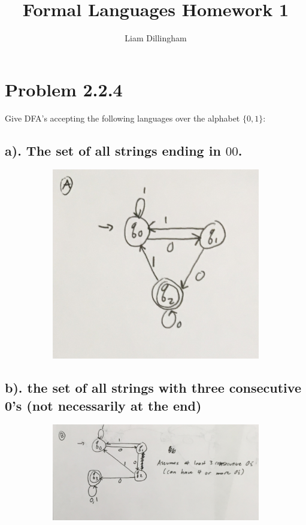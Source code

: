 \documentclass[20pt]{article} %
\title{Formal Languages Homework 1}
\author{Liam Dillingham}
\begin{document}
\maketitle

\section{Problem 2.2.4}
Give DFA's accepting the following languages over the alphabet $\{0,1\}$:
\subsection{a). The set of all strings ending in $00$.}
\begin{figure}[!htbp]
  	\centering
   	\begin{subfigure}[p]{0.5\linewidth}
    	\includegraphics[width=\linewidth]{./figures/H1-1a.png}
   	\end{subfigure}
\end{figure} 
\newpage
\subsection{b). the set of all strings with three consecutive 0's (not necessarily at the end)}
\begin{figure}[!htbp]
  	\centering
   	\begin{subfigure}[p]{1.1\linewidth}
    	\includegraphics[width=\linewidth]{./figures/H1-1b.png}
   	\end{subfigure}
\end{figure} 
\end{document}
